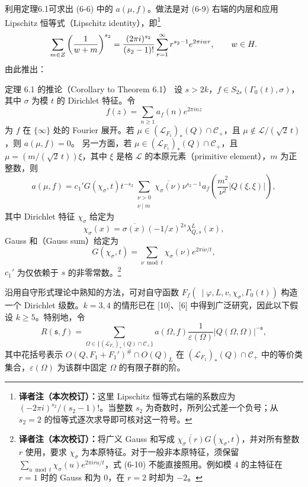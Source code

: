 利用定理6.1可求出 (6-6) 中的 $a(\mu,f)$。做法是对 (6-9) 右端的内层和应用 Lipschitz 恒等式（Lipschitz identity），即\footnote{\textbf{译者注（本次校订）：}这里 Lipschitz 恒等式右端的系数应为 $(-2\pi i)^{s_2}/(s_2-1)!$。当整数 $s_2$ 为奇数时，所列公式差一个负号；从 $s_2=2$ 的恒等式逐次求导即可核对这一符号。}
\[
 \sum_{m\in Z}\left(\frac1{w+m}\right)^{s_2}
 =\frac{(2\pi i)^{s_2}}{(s_2-1)!}\sum_{r=1}^{\infty}r^{s_2-1}e^{2\pi iwr},\qquad w\in H.
\]
由此推出：
\begin{originaltheorem}{定理 6.1 的推论（Corollary to Theorem 6.1）}
设 $s>2k$，$f\in S_{2s}(\Gamma_0(t),\sigma)$，其中 $\sigma$ 为模 $t$ 的 Dirichlet 特征。令
\[
 f(z)=\sum_{n\ge1}a_f(n)e^{2\pi inz}
\]
为 $f$ 在 $\{\infty\}$ 处的 Fourier 展开。若
$\mu\in(\mathcal L_{F_1})_*(Q)\cap\mathcal C_+$，且
$\mu\notin\mathcal L/(\sqrt2\,t)$，则 $a(\mu,f)=0$。
另一方面，若 $\mu\in(\mathcal L_{F_1})_*(Q)\cap\mathcal C_+$，且
$\mu=(m/(\sqrt2\,t))\xi$，其中 $\xi$ 是格 $\mathcal L$ 的本原元素（primitive element），$m$ 为正整数，则
\begin{equation}
 a(\mu,f)=c_1'G(\chi_\sigma,t)t^{-s_2}
 \sum_{\substack{\nu>0\\\nu\mid m}}\overline{\chi_\sigma(\nu)}\nu^{s_2-1}
 a_f\!\left(\frac{m^2}{\nu^2}|Q(\xi,\xi)|\right),\tag{6-10}
\end{equation}
其中 Dirichlet 特征 $\chi_\sigma$ 给定为
\[
 \chi_\sigma(x)=\overline{\sigma(x)}(-1/x)^{2s}\lambda_{Q,s}^L(x),
\]
Gauss 和（Gauss sum）给定为
\[
 G(\chi_\sigma,t)=\sum_{\nu\bmod t}\chi_\sigma(\nu)e^{2\pi i\nu/t},
\]
$c_1'$ 为仅依赖于 $s$ 的非零常数。\footnote{\textbf{译者注（本次校订）：}将广义 Gauss 和写成 $\overline{\chi_\sigma(r)}G(\chi_\sigma,t)$，并对所有整数 $r$ 使用，要求 $\chi_\sigma$ 为本原特征。对于一般非本原特征，须保留 $\sum_{u\bmod t}\chi_\sigma(u)e^{2\pi iru/t}$，式 (6-10) 不能直接照用。例如模 $4$ 的主特征在 $r=1$ 时的 Gauss 和为 $0$，在 $r=2$ 时却为 $-2$。}
\end{originaltheorem}

沿用自守形式理论中熟知的方法，可对自守函数
$F_f(\ \mid\varphi,L,v,\chi_\sigma,\Gamma_0(t))$ 构造一个 Dirichlet 级数。$k=3,4$ 的情形已在 [10]、[6] 中得到广泛研究，因此以下假设 $k\ge5$。特别地，令
\begin{equation}
 R(\mathfrak s,f)=\sum_{\Omega\in\{(\mathcal L_{F_1})_*(Q)\cap\mathcal C_+\}}
 a(\Omega,f)\frac1{\varepsilon(\Omega)}|Q(\Omega,\Omega)|^{-\mathfrak s},\tag{6-11}
\end{equation}
其中花括号表示 $O(Q,F_1+F_1')^\#\cap O(Q)_L$ 在
$(\mathcal L_{F_1})_*(Q)\cap\mathcal C_+$ 中的等价类集合，$\varepsilon(\Omega)$ 为该群中固定 $\Omega$ 的有限子群的阶。

